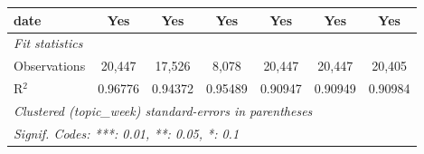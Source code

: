 \begin{table}[htbp]
\begin{tabular}{lcccccc}
      date              & Yes             & Yes             & Yes      & Yes             & Yes             & Yes\\  
      \midrule
      \emph{Fit statistics}\\
      Observations      & 20,447          & 17,526          & 8,078    & 20,447          & 20,447          & 20,405\\  
      R$^2$             & 0.96776         & 0.94372         & 0.95489  & 0.90947         & 0.90949         & 0.90984\\  
      \midrule \midrule
      \multicolumn{7}{l}{\emph{Clustered (topic\_week) standard-errors in parentheses}}\\
      \multicolumn{7}{l}{\emph{Signif. Codes: ***: 0.01, **: 0.05, *: 0.1}}\\
   \end{tabular}
\end{table}



